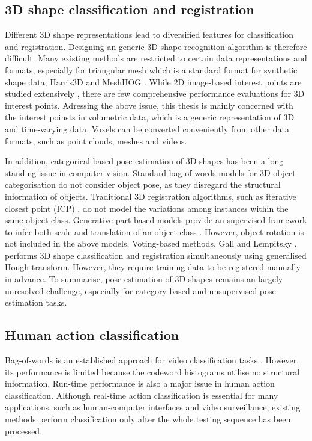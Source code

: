 \subsection{3D shape classification and registration} 

Different 3D shape representations lead to diversified features for classification and registration. Designing an generic 3D shape recognition algorithm is therefore difficult. Many existing methods are restricted to certain data representations and formats, especially for triangular mesh which is a standard format for synthetic shape data, \eg Harris3D \cite{Sipiran2011} and MeshHOG \cite{Zaharescu2009}.     
While 2D image-based interest points are studied extensively \cite{Mikolajczyk2005}, there are few comprehensive performance evaluations for 3D interest points. 
Adressing the above issue, this thesis is mainly concerned with the interest poinsts in volumetric data, which is a generic representation of 3D and time-varying data. Voxels can be converted conveniently from other data formats, such as point clouds, meshes and videos. 

In addition, categorical-based pose estimation of 3D shapes has been a long standing issue in computer vision.
Standard bag-of-words models for 3D object categorisation do not consider object pose, as they disregard the structural information of objects. Traditional 3D registration algorithms, such as iterative closest point (ICP) \cite{Besl1992}, do not model the variations among instances within the same object class. 
Generative part-based models provide an supervised framework to infer both scale and translation of an object class \cite{Weber2000, Fergus2007}. However, object rotation is not included in the above models. 
Voting-based methods, \eg Gall and Lempitsky \cite{Gall2009a}, performs 3D shape classification and registration simultaneously using generalised Hough transform. However, they require training data to be registered manually in advance.  
To summarise, pose estimation of 3D shapes remains an largely unresolved challenge, especially for category-based and unsupervised pose estimation tasks.  

\subsection{Human action classification}


Bag-of-words is an established approach for video classification tasks \cite{Schuldt2004, Dollar2005, Riemenschneider2009, Niebles2008, Wong2007}. However, its performance is limited because the codeword histograms utilise no structural information. Run-time performance is also a major issue in human action classification. Although real-time action classification is essential for many applications, such as human-computer interfaces and video surveillance, existing methods perform classification only after the whole testing sequence has been processed. 

